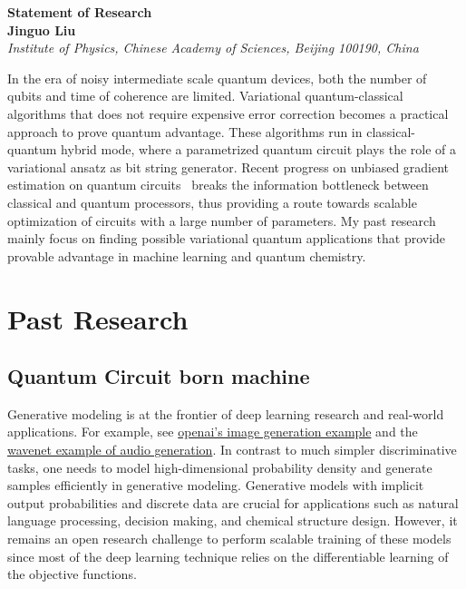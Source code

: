 \documentclass[aps,longbibliography,english,superscriptaddress]{revtex4-1}
\begin{document}
\begin{center}
    \vspace*{1cm}

    \Huge
    \textbf{Statement of Research}\\
    \vspace{0.5cm}
    \large
    \textbf{Jinguo Liu}\\
    \vspace{0.5cm}
    \small\textit{Institute of Physics, Chinese Academy of Sciences, Beijing 100190, China}
    \vspace{0.5cm}
\end{center}

In the era of noisy intermediate scale quantum devices, both the number of qubits and time of coherence are limited. Variational quantum-classical algorithms that does not require expensive error correction becomes a practical approach to prove quantum advantage. These algorithms run in classical-quantum hybrid mode, where a parametrized quantum circuit plays the role of a variational ansatz as bit string generator. Recent progress on unbiased gradient estimation on quantum circuits~\cite{Li2017a, Mitarai2018} breaks the information bottleneck between classical and quantum processors, thus providing a route towards scalable optimization of circuits with a large number of parameters.
My past research mainly focus on finding possible variational quantum applications that provide provable advantage in machine learning and quantum chemistry.

\section{Past Research}
\subsection{Quantum Circuit born machine}
Generative modeling is at the frontier of deep learning research and real-world applications. For example, see \href{https://blog.openai.com/generative-models/}{openai's image generation example} and the \href{https://deepmind.com/blog/wavenet-generative-model-raw-audio/}{wavenet example of audio generation}. In contrast to much simpler discriminative tasks, one needs to model high-dimensional probability density and generate samples efficiently in generative modeling. Generative models with implicit output probabilities and discrete data are crucial for applications such as natural language processing, decision making, and chemical structure design. However, it remains an open research challenge to perform scalable training of these models since most of the deep learning technique relies on the differentiable learning of the objective functions. 
\end{document}
